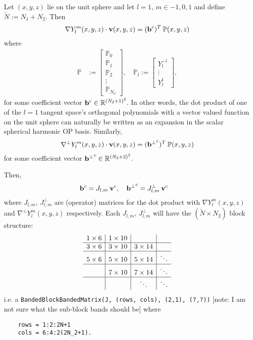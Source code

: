 \documentclass[11pt, oneside]{article}   	%
\newcommand{\R}{\mathbb{R}}
\newcommand{\bigP}{\mathbb{P}}
\newcommand{\Pl}{\mathbb{P}_l}
\newcommand{\gradYlm}{\nabla Y^m_l}
\newcommand{\gradpYlm}{\nabla^\perp Y^m_l}
\begin{document}
Let \((x,y,z)\) lie on the unit sphere and let \(l = 1\), \(m \in {-1, 0, 1}\) and define \(\tilde{N} := N_1 + N_2\). Then
\begin{align}
\gradYlm(x,y,z) \cdot \bold{v}(x,y,z) = (\bold{b}^c)^T  \: \bigP(x,y,z)
\end{align}
where
\begin{align}
\bigP &:= \begin{bmatrix}
		\bigP_0 \\
		\bigP_1 \\
		\bigP_2 \\
		\vdots \\
		\bigP_{N_2}
	  \end{bmatrix}, \quad 
\Pl := \begin{bmatrix}
		Y_l^{-l} \\
		\vdots \\	
		Y_l^l
	  \end{bmatrix},
\end{align}
for some coefficient vector \(\bold{b}^c \in \R^{(N_2+1)^2}\). In other words, the dot product of one of the \(l=1\) tangent space's orthogonal polynomials with a vector valued function on the unit sphere can naturally be written as an expansion in the scalar spherical harmonic OP basis. Similarly,
\begin{align}
\gradpYlm(x,y,z) \cdot \bold{v}(x,y,z) = (\bold{b^\perp}^c)^T  \: \bigP(x,y,z)
\end{align}
for some coefficient vector \(\bold{b^\perp}^c \in \R^{(N_2+2)^2}\).

Then, 
\begin{align}
\bold{b}^c &= J_{l,m} \: \bold{v}^c, \quad 
\bold{b^\perp}^c = J^\perp_{l,m} \: \bold{v}^c
\end{align}
where \(J_{l,m}\), \(J^\perp_{l,m}\) are (operator) matrices for the dot product with \(\gradYlm(x,y,z)\) and \(\gradpYlm(x,y,z)\) respectively.
Each \(J_{l,m}\), \(J^\perp_{l,m}\) will have the \((\tilde{N} \times N_2)\) block structure:
\begin{align}
	\begin{array}{c|c|c|c}
		1 \times 6 & 1 \times 10 & \\
		\hline
		3 \times 6 & 3 \times 10 & 3 \times 14 & \\
		\hline
		5 \times 6 & 5 \times 10 & 5 \times 14 & \ddots \\
		\hline
		&  7 \times 10 & 7 \times 14 & \ddots \\
		\hline
		& & \ddots & \ddots \\
	  \end{array}
\end{align}
i.e. a {\tt BandedBlockBandedMatrix(J, (rows, cols), (2,1), (?,?))} [note: I am not sure what the sub-block bands should be] where 
\begin{verbatim}
    rows = 1:2:2N+1 
    cols = 6:4:2(2N_2+1).
\end{verbatim}
\end{document}
